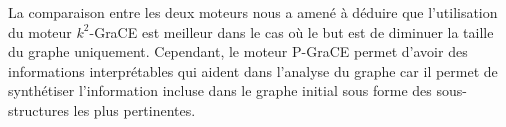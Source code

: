 	La comparaison entre les deux moteurs nous a amené à déduire que l'utilisation du moteur $k^2$-GraCE est meilleur dans le cas où le but est de diminuer la taille du graphe uniquement. Cependant, le moteur P-GraCE permet d'avoir des informations interprétables qui aident dans l'analyse du graphe car il permet de synthétiser l'information incluse dans le graphe initial sous forme des sous-structures les plus pertinentes.
	
	
	
	
	
	
	
	
	
	
	
	
	
	
	
	
	
	
	
	
	
	
	
	
	
	
	